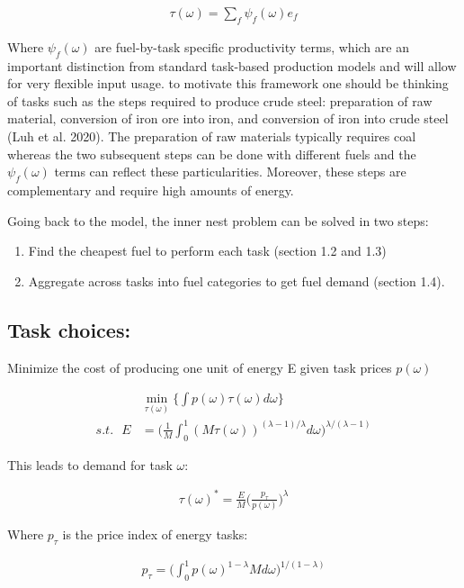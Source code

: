 \documentclass{article}
\begin{document}
\begin{align}
    \tau(\omega) = \sum_{f} \psi_f(\omega) e_f
\end{align}

Where $\psi_f(\omega)$ are fuel-by-task specific productivity terms, which are an important distinction from standard task-based production models and will allow for very flexible input usage. to motivate this framework one should be thinking of tasks such as the steps required to produce crude steel: preparation of raw material, conversion of iron ore into iron, and conversion of iron into crude steel (Luh et al. 2020). The preparation of raw materials typically requires coal whereas the two subsequent steps can be done with different fuels and the $\psi_f(\omega)$ terms can reflect these particularities. Moreover, these steps are complementary and require high amounts of energy.

Going back to the model, the inner nest problem can be solved in two steps: 

\begin{enumerate}
    \item Find the cheapest fuel to perform each task (section 1.2 and 1.3)
    \item Aggregate across tasks into fuel categories to get fuel demand (section 1.4).
\end{enumerate}

\subsection{Task choices: } Minimize the cost of producing one unit of energy E given task prices $p(\omega)$

\begin{align*}
    &\min_{\tau(\omega)} \Big\{ \int p(\omega) \tau(\omega) d\omega \Big\} \\
    s.t. \text{  }  E &= \Big( \frac{1}{M} \int_0^1 (M\tau(\omega))^{(\lambda-1)/\lambda} d\omega \Big)^{\lambda/(\lambda-1)} 
\end{align*}

This leads to demand for task $\omega$:

\begin{align}
    \tau(\omega)^* = \frac{E}{M} \Big( \frac{p_{\tau}}{p(\omega)} \Big)^{\lambda}
\end{align}

Where $p_{\tau}$ is the price index of energy tasks: 

\begin{align}
    p_{\tau} = \Big(  \int_0^1 p(\omega)^{1-\lambda} M d\omega \Big)^{1/(1-\lambda)}
\end{align}
\end{document}
